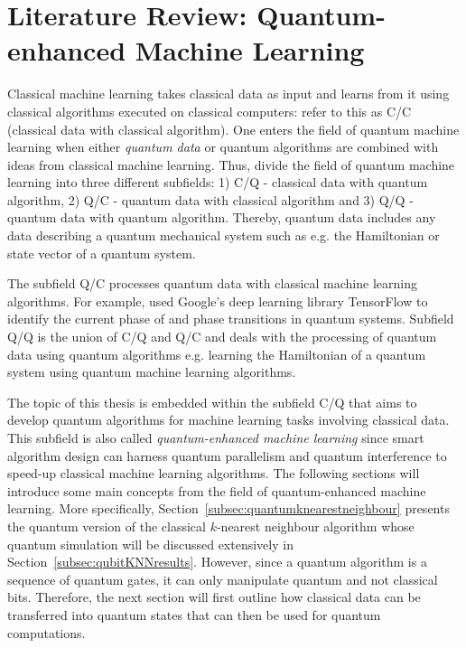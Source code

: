 \chapter{Literature Review: Quantum-enhanced Machine Learning}\label{sec:qml}

Classical machine learning takes classical data as input and learns from it using classical algorithms executed on classical computers:  refer to this as C/C (classical data with classical algorithm). One enters the field of quantum machine learning when either \emph{quantum data} or quantum algorithms are combined with ideas from classical machine learning. Thus,  divide the field of quantum machine learning into three different subfields: 1) C/Q - classical data with quantum algorithm, 2) Q/C - quantum data with classical algorithm and 3) Q/Q - quantum data with quantum algorithm. Thereby, quantum data includes any data describing a quantum mechanical system such as e.g. the Hamiltonian or state vector of a quantum system.

The subfield Q/C processes quantum data with classical machine learning algorithms. For example,  used Google's deep learning library TensorFlow to identify the current phase of and phase transitions in quantum systems. Subfield Q/Q  is the union of C/Q and Q/C and deals with the processing of quantum data using quantum algorithms e.g. learning the Hamiltonian of a quantum system using quantum machine learning algorithms.

The topic of this thesis is embedded within the subfield C/Q that aims to develop quantum algorithms for machine learning tasks involving classical data. This subfield is also called \emph{quantum-enhanced machine learning} since smart algorithm design can harness quantum parallelism and quantum interference to speed-up classical machine learning algorithms. The following sections will introduce some main concepts from the field of quantum-enhanced machine learning. More specifically, Section~\ref{subsec:quantumknearestneighbour} presents the quantum version of the classical $k$-nearest neighbour algorithm whose quantum simulation will be discussed extensively in Section~\ref{subsec:qubitKNNresults}. However, since a quantum algorithm is a sequence of quantum gates, it can only manipulate quantum and not classical bits. Therefore, the next section will first outline how classical data can be transferred into quantum states that can then be used for quantum computations.

